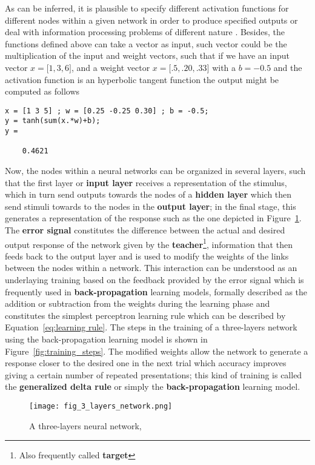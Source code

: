 \documentclass{WileySev}
\begin{document}
As can be inferred, it is plausible to specify different activation functions for different nodes within a given network in order to produce specified outputs or deal with information processing problems of different nature \cite{jiang2010medical}. Besides, the functions defined above can take a vector as input, such vector could be the multiplication of the input and weight vectors, such that if we have an input vector $x=\big[1,3,6\big]$, and a weight vector $x=\big[.5,.20,.33\big]$ with a $b=-0.5$ and the activation function is an hyperbolic tangent function the output might be computed as follows

\begin{lstlisting}
x = [1 3 5] ; w = [0.25 -0.25 0.30] ; b = -0.5;
y = tanh(sum(x.*w)+b);
y =

    0.4621
\end{lstlisting}

Now, the nodes within a neural networks can be organized in several layers, such that the first layer or \textbf{input layer} receives a representation of the stimulus, which in turn send outputs towards the nodes of a \textbf{hidden layer} which then send stimuli towards to the nodes in the \textbf{output layer}; in the final stage, this generates a representation of the response such as the one depicted in Figure~\ref{fig:three_layers}. The \textbf{error signal} constitutes the difference between the actual and desired output response of the network given by the \textbf{teacher}\footnote{Also frequently called \textbf{target}}, information that then feeds back to the output layer and is used to modify the weights of the links between the nodes within a network. This interaction can be understood as an underlaying training based on the feedback provided by the error signal which is frequently used in \textbf{back-propagation} learning models, formally described as the addition or subtraction from the weights during the learning phase and constitutes the simplest perceptron learning rule which can be described by Equation~\ref{eq:learning rule}. The steps in the training of a three-layers network using the back-propagation learning model is shown in Figure~\ref{fig:training_steps}. The modified weights allow the network to generate a response closer to the desired one in the next trial which accuracy improves giving a certain number of repeated presentations; this kind of training is called the \textbf{generalized delta rule} or simply the \textbf{back-propagation} learning model.

\begin{figure}
  \texttt{[image: fig\_3\_layers\_network.png]}
  \centering
  \caption{A three-layers neural network, \cite{friedenberg2011cognitive}}
  \label{fig:three_layers}
\end{figure}
\end{document}
